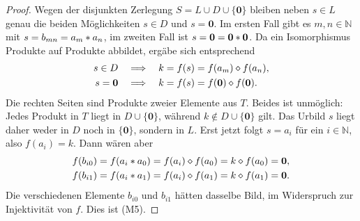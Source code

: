 \documentclass[main.tex]{subfiles}
\begin{document}
\begin{proof}
Wegen der disjunkten Zerlegung
\(S=L\cup D\cup\{\mathbf0\}\) bleiben neben \(s\in L\) genau die beiden
Möglichkeiten \(s\in D\) und \(s=\mathbf0\). Im ersten Fall gibt es
\(m,n\in\mathbb N\) mit \(s=b_{mn}=a_m\mathbin{\ast} a_n\), im zweiten Fall ist
\(s=\mathbf0=\mathbf0\mathbin{\ast}\mathbf0\). Da ein Isomorphismus Produkte auf
Produkte abbildet, ergäbe sich entsprechend
\[
  \begin{aligned}
    s\in D&\quad\Longrightarrow\quad
      k=f(s)=f(a_m)\mathbin{\diamond} f(a_n),\\
    s=\mathbf0&\quad\Longrightarrow\quad
      k=f(s)=f(\mathbf0)\mathbin{\diamond} f(\mathbf0).
  \end{aligned}
\]
Die rechten Seiten sind Produkte zweier Elemente aus \(T\). Beides ist
unmöglich: Jedes Produkt in \(T\) liegt in
\(D\cup\{\mathbf0\}\), während \(k\notin D\cup\{\mathbf0\}\) gilt. Das
Urbild \(s\) liegt daher weder in \(D\) noch in \(\{\mathbf0\}\), sondern
in \(L\). Erst jetzt folgt \(s=a_i\) für ein \(i\in\mathbb N\), also
\(f(a_i)=k\). Dann wären aber
\[
  \begin{aligned}
    f(b_{i0})
      &=f(a_i\mathbin{\ast} a_0)
        =f(a_i)\mathbin{\diamond} f(a_0)
        =k\mathbin{\diamond} f(a_0)=\mathbf0,\\
    f(b_{i1})
      &=f(a_i\mathbin{\ast} a_1)
        =f(a_i)\mathbin{\diamond} f(a_1)
        =k\mathbin{\diamond} f(a_1)=\mathbf0.
  \end{aligned}
\]
Die verschiedenen Elemente \(b_{i0}\) und \(b_{i1}\) hätten dasselbe Bild,
im Widerspruch zur Injektivität von \(f\). Dies ist \textup{(M5)}.
\end{proof}
\end{document}
